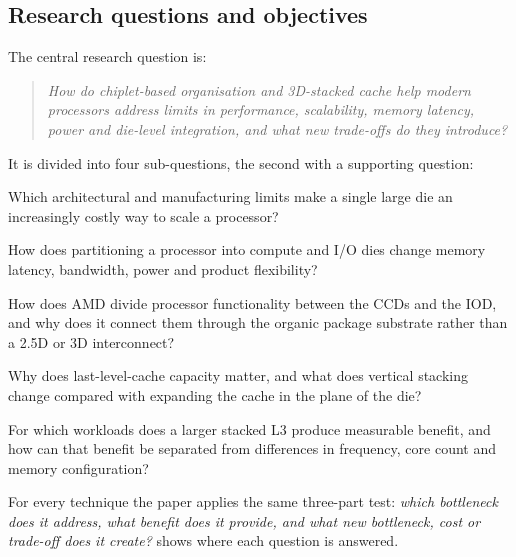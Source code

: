

\subsection{Research questions and objectives}
\label{sec:rq}

The central research question is:

\begin{quote}
\itshape How do chiplet-based organisation and 3D-stacked cache help modern processors address limits in performance, scalability, memory latency, power and die-level integration, and what new trade-offs do they introduce?
\end{quote}

It is divided into four sub-questions, the second with a supporting question:

\begin{description}[leftmargin=1.2cm,style=nextline]
  \item[RQ1] Which architectural and manufacturing limits make a single large die an increasingly costly way to scale a processor?
  \item[RQ2] How does partitioning a processor into compute and I/O dies change memory latency, bandwidth, power and product flexibility?
  \item[RQ2a] How does AMD divide processor functionality between the CCDs and the IOD, and why does it connect them through the organic package substrate rather than a 2.5D or 3D interconnect?
  \item[RQ3] Why does last-level-cache capacity matter, and what does vertical stacking change compared with expanding the cache in the plane of the die?
  \item[RQ4] For which workloads does a larger stacked L3 produce measurable benefit, and how can that benefit be separated from differences in frequency, core count and memory configuration?
\end{description}

For every technique the paper applies the same three-part test: \emph{which bottleneck does it address, what benefit does it provide, and what new bottleneck, cost or trade-off does it create?}  shows where each question is answered.

